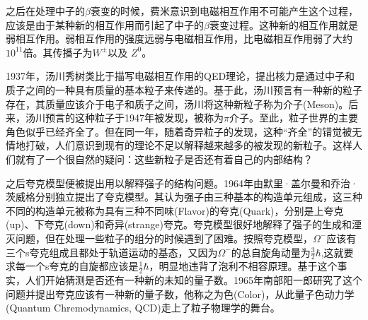 之后在处理中子的$\beta$衰变的时候，费米意识到电磁相互作用不可能产生这个过程，应该是由于某种新的相互作用而引起了中子的$\beta$衰变过程。这种新的相互作用就是弱相互作用\cite{Fermi:1934n j j j j j j}。弱相互作用的强度远弱与电磁相互作用，比电磁相互作用弱了大约$10^{11}$倍。其传播子为$W^{\pm}$以及 $Z^0$。

1937年，汤川秀树类比于描写电磁相互作用的QED理论，提出核力是通过中子和质子之间的一种具有质量的基本粒子来传递的。基于此，汤川预言有一种新的粒子存在，其质量应该介于电子和质子之间，汤川将这种新粒子称为介子(Meson)。后来，汤川预言的这种粒子于1947年被发现，被称为$\pi$介子。至此，粒子世界的主要角色似乎已经齐全了。但在同一年，随着奇异粒子的发现，这种“齐全”的错觉被无情地打破，人们意识到现有的理论不足以解释越来越多的被发现的新粒子。这样人们就有了一个很自然的疑问：这些新粒子是否还有着自己的内部结构？

之后夸克模型便被提出用以解释强子的结构问题。1964年由默里·盖尔曼和乔治·茨威格分别独立提出了夸克模型。其认为强子由三种基本的构造单元组成，这三种不同的构造单元被称为具有三种不同味(Flavor)的夸克(Quark)，分别是上夸克(up)、下夸克(down)和奇异(strange)夸克。夸克模型很好地解释了强子的生成和湮灭问题，但在处理一些粒子的组分的时候遇到了困难。按照夸克模型，$\Omega^-$应该有三个s夸克组成且都处于轨道运动的基态，又因为$\Omega^-$的总自旋角动量为$\frac{3}{2}\hbar$,这就要求每一个s夸克的自旋都应该是$\frac{1}{2}\hbar$，明显地违背了泡利不相容原理。基于这个事实，人们开始猜测是否还有一种新的未知的量子数。1965年南部阳一郎研究了这个问题并提出夸克应该有一种新的量子数，他称之为色(Color)，从此量子色动力学(Quantum Chremodynamics, QCD)走上了粒子物理学的舞台。

